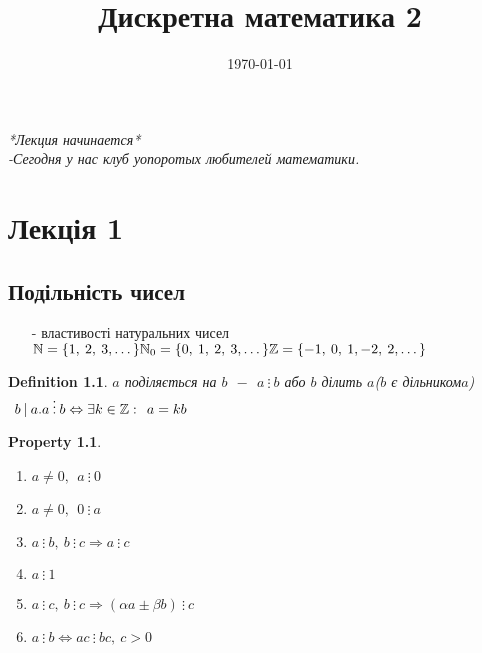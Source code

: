 \documentclass[a4paper,12pt]{bookest}
\title{Дискретна математика 2}
\date{\today}
\newtheorem{definition}{Definition}[section]
\newtheorem*{property*}{Property}
\begin{document}
\maketitle
\vspace*{\fill}
\begin{flushright}
\emph{*Лекция начинается*}\\
\emph{-Сегодня у нас клуб уопоротых любителей математики.}
\end{flushright}
\let\cleardoublepage\clearpage
\tableofcontents
\chapter{Лекція 1}
\section{Подільність чисел}
	\begin{enumerate}
		\item[-]властивості натуральних чисел\\
		$\mathbb{N}=\{1,\>2,\>3,\dots\}\\
		\mathbb{N}_0=\{0,\>1,\>2,\>3,\dots\}\\
		\mathbb{Z}=\{-1,\>0,\>1,-2,\>2,\dots\}$
	\end{enumerate}
	\begin{definition}
		$a$ поділяється на $b\>\>-\>\>a\>\vdots\>b$ або  $b$ ділить $a$($b$ є дільником$a$)$\>\>b\>|\>a.\\
		a\>\vdots\>b\Leftrightarrow\exists k\in\mathbb{Z}:\>\>a=kb$
	\end{definition}
	\begin{property*}$ $
	\begin{enumerate}
		\item $a\neq 0,\>\>a\>\vdots\>0$
		\item $a\neq 0,\>\>0\>\vdots\>a$
		\item $a\>\vdots\>b,\>b\>\vdots\>c\Rightarrow a\>\vdots\>c$
		\item $a\>\vdots\>1$
		\item $a\>\vdots\>c,\>b\>\vdots\>c\Rightarrow (\alpha a\pm\beta b)\>\vdots\>c$
		\item $a\>\vdots\>b\Leftrightarrow ac\>\vdots\>bc,\>c>0$
	\end{enumerate}		
	\end{property*}
\end{document}
